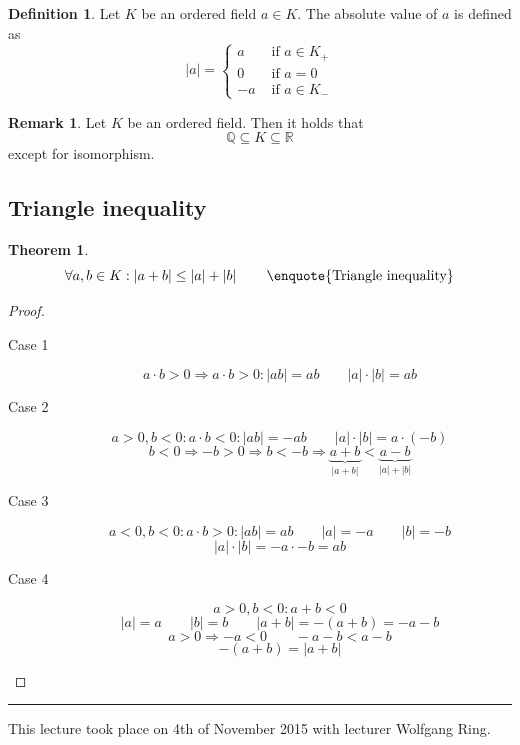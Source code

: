 \documentclass[a4paper,landscape,twocolumn]{article}
\theoremstyle{definition}
\newtheorem{theorem}{Theorem}
\newtheorem{defi}{Definition}
\newtheorem{rem}{Remark}
\newcommand\abs[1]{\left|#1\right|}
\newcommand\meta[3]{\hrule{} This #1 took place on #2 with lecturer #3.\par}
\begin{document}
\begin{defi}
  Let $K$ be an ordered field $a \in K$.
  The absolute value of $a$ is defined as
  \[
    \abs{a} = \begin{cases}
      a & \text{ if } a \in K_+ \\
      0 & \text{ if } a = 0 \\
      -a & \text{ if } a \in K_-
    \end{cases}
  \]
\end{defi}

\begin{rem}
  Let $K$ be an ordered field. Then it holds that
  \[ \mathbb{Q} \subseteq K \subseteq \mathbb{R} \]
  except for isomorphism.
\end{rem}

\subsection{Triangle inequality}
\begin{theorem}
  \[ \forall a, b \in K: \abs{a + b} \leq \abs{a} + \abs{b} \qquad \text{\enquote{Triangle inequality}} \]
\end{theorem}
\begin{proof}
  \begin{description}
    \item[Case 1]
      \[ a \cdot b > 0 \Rightarrow a \cdot b > 0: \abs{ab} = ab \qquad \abs{a}\cdot\abs{b} = ab \]
    \item[Case 2]
      \[ a > 0, b < 0: a \cdot b < 0: \abs{ab} = -ab \qquad \abs{a} \cdot \abs{b} = a \cdot (-b) \]
      \[ b < 0 \Rightarrow -b > 0 \Rightarrow b < -b \Rightarrow \underbrace{a + b}_{\abs{a + b}} < \underbrace{a - b}_{\abs{a} + \abs{b}} \]
    \item[Case 3]
      \[ a < 0, b < 0: a \cdot b > 0: \abs{ab} = ab \qquad \abs{a} = -a \qquad \abs{b} = -b  \]
      \[ \abs{a} \cdot \abs{b} = -a \cdot -b = a b \]
    \item[Case 4]
      \[ a > 0, b < 0: a + b < 0 \]
      \[ \abs{a} = a \qquad \abs{b} = b \qquad \abs{a + b} = -(a + b) = -a - b \]
      \[ a > 0 \Rightarrow -a < 0 \qquad -a - b < a - b \]
      \[ -(a + b) = \abs{a + b} \]
  \end{description}
\end{proof}

\meta{lecture}{4th of November 2015}{Wolfgang Ring}
\end{document}
